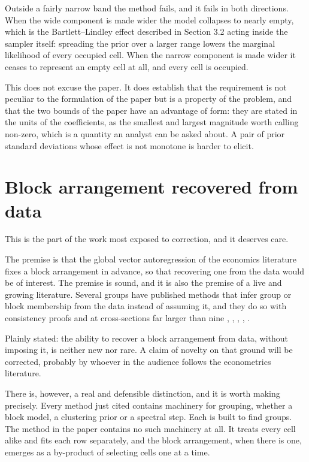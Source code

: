 Outside a fairly narrow band the method fails, and it fails in both directions. When
the wide component is made wider the model collapses to nearly empty, which is the
Bartlett--Lindley effect described in Section 3.2 acting inside the sampler itself:
spreading the prior over a larger range lowers the marginal likelihood of every
occupied cell. When the narrow component is made wider it ceases to represent an
empty cell at all, and every cell is occupied.

This does not excuse the paper. It does establish that the requirement is not
peculiar to the formulation of the paper but is a property of the problem, and that
the two bounds of the paper have an advantage of form: they are stated in the units
of the coefficients, as the smallest and largest magnitude worth calling non-zero,
which is a quantity an analyst can be asked about. A pair of prior standard
deviations whose effect is not monotone is harder to elicit.

\section{Block arrangement recovered from data}

This is the part of the work most exposed to correction, and it deserves care.

The premise is that the global vector autoregression of the economics literature
fixes a block arrangement in advance, so that recovering one from the data would be
of interest. The premise is sound, and it is also the premise of a live and growing
literature. Several groups have published methods that infer group or block
membership from the data instead of assuming it, and they do so with consistency
proofs and at cross-sections far larger than nine
\cite{gudmundsson2021}, \cite{brownlees2017}, \cite{billio2019},
\cite{huang2012}, \cite{kim2026}.

Plainly stated: the ability to recover a block arrangement from data, without
imposing it, is neither new nor rare. A claim of novelty on that ground will be
corrected, probably by whoever in the audience follows the econometrics literature.

There is, however, a real and defensible distinction, and it is worth making
precisely. Every method just cited contains machinery for grouping, whether a block
model, a clustering prior or a spectral step. Each is built to find groups. The
method in the paper contains no such machinery at all. It treats every cell alike
and fits each row separately, and the block arrangement, when there is one, emerges
as a by-product of selecting cells one at a time.

